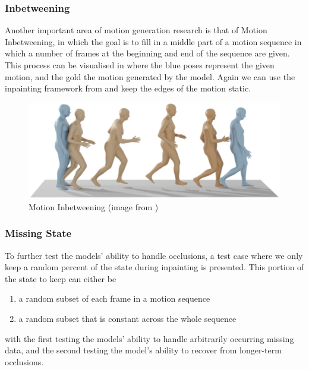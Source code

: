\subsubsection{Inbetweening}
Another important area of motion generation research is that of Motion Inbetweening, in which the goal is to fill in a middle part of a motion sequence in which a number of frames at the beginning and end of the sequence are given. This process can be visualised in  where the blue poses represent the given motion, and the gold the motion generated by the model. Again we can use the inpainting framework from  and keep the edges of the motion static.

\begin{figure}[!ht]
    \centering
    \includegraphics[width=1\textwidth]{Figures/diffusion/mdm_inbetweening.png}
    \caption{Motion Inbetweening (image from \cite{MDM})}
    \label{fig:mdm_inbetweening}
\end{figure}

\subsubsection{Missing State}
To further test the models' ability to handle occlusions, a test case where we only keep a random percent of the state during inpainting is presented. This portion of the state to keep can either be 
\begin{enumerate}
    \item a random subset of each frame in a motion sequence
    \item a random subset that is constant across the whole sequence
\end{enumerate}
with the first testing the models' ability to handle arbitrarily occurring missing data, and the second testing the model's ability to recover from longer-term occlusions.


